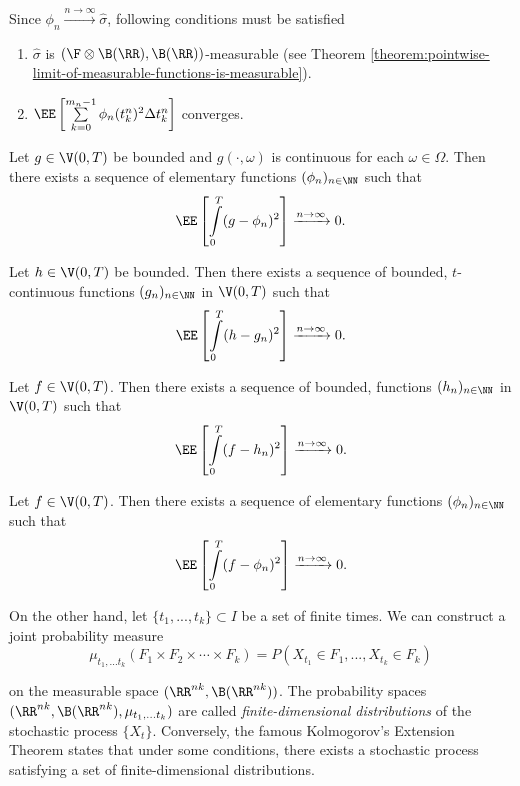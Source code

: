 Since $\phi_n\xrightarrow{n\to\infty}\hat{\sigma}$, following conditions must be satisfied

\begin{enumerate}[label=(\roman*), ref=(\roman*)]
    \item $\hat{\sigma}$ is $(\F\otimes\B(\RR), \B(\RR))$-measurable (see Theorem \ref{theorem:pointwise-limit-of-measurable-functions-is-measurable}).
    \item $\EE\left[\sum\limits_{k=0}^{m_n-1} \phi_n(t_{k}^n)^2 \Delta t_k^n\right]$ converges.
\end{enumerate}

\begin{lemma}
    Let $g\in \V(0,T)$ be bounded and $g(\cdot, \omega)$ is continuous for each $\omega\in\Omega$. Then there exists a sequence of elementary functions $(\phi_n)_{n\in\NN}$ such that
    $$\EE\left[\int\limits_0^T(g-\phi_n)^2\right]\xrightarrow{n\to\infty}0.$$
\end{lemma}

\begin{lemma}
    Let $h\in \V(0,T)$ be bounded. Then there exists a sequence of bounded, $t$-continuous functions $(g_n)_{n\in\NN}$ in $\V(0,T)$ such that
    $$\EE\left[\int\limits_0^T(h-g_n)^2\right]\xrightarrow{n\to\infty}0.$$
\end{lemma}

\begin{lemma}
    Let $f\in \V(0,T)$. Then there exists a sequence of bounded, functions $(h_n)_{n\in\NN}$ in $\V(0,T)$ such that
    $$\EE\left[\int\limits_0^T(f-h_n)^2\right]\xrightarrow{n\to\infty}0.$$
\end{lemma}

\begin{theorem}
    Let $f\in \V(0,T)$. Then there exists a sequence of elementary functions $(\phi_n)_{n\in\NN}$ such that
    $$\EE\left[\int\limits_0^T(f-\phi_n)^2\right]\xrightarrow{n\to\infty}0.$$
\end{theorem}

On the other hand, let $\{t_1,...,t_k\}\subset I$ be a set of finite times. We can construct a joint probability measure
$$\mu_{t_1,...t_k}(F_1\times F_2\times\cdots\times F_k)=P(X_{t_1}\in F_1,...,X_{t_k}\in F_k)$$

on the measurable space $(\RR^{nk},\B(\RR^{nk}))$. The probability spaces $(\RR^{nk},\B(\RR^{nk}),\mu_{t_1,...t_k})$ are called \textit{finite-dimensional distributions} of the stochastic process $\{X_t\}$. Conversely, the famous Kolmogorov's Extension Theorem \cite{oksendal2013stochastic} states that under some conditions, there exists a stochastic process satisfying a set of finite-dimensional distributions.


